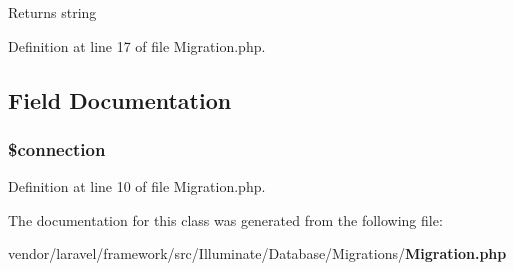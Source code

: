 \begin{DoxyReturn}{Returns}
string 
\end{DoxyReturn}


Definition at line 17 of file Migration.\+php.



\subsection{Field Documentation}
\subsubsection[{\$connection}]{\setlength{\rightskip}{0pt plus 5cm}\$connection\hspace{0.3cm}{\ttfamily [protected]}}\label{class_illuminate_1_1_database_1_1_migrations_1_1_migration_a0d9c79b9b86b3f5891c6d3892f12c6a0}


Definition at line 10 of file Migration.\+php.



The documentation for this class was generated from the following file\+:\begin{DoxyCompactItemize}
\item 
vendor/laravel/framework/src/\+Illuminate/\+Database/\+Migrations/{\bf Migration.\+php}\end{DoxyCompactItemize}
